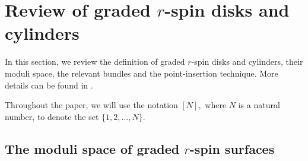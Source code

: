 \documentclass[11pt]{amsart}
\theoremstyle{definition}
\theoremstyle{remark}
\newcommand{\<}{\left<}
\renewcommand{\>}{\right>}
\numberwithin{equation}{section}
\begin{document}
\section{Review of graded $r$-spin disks and cylinders}\label{sec review}
\label{sec mod and bundle}
In %
this section, we review the definition of graded $r$-spin disks and cylinders, their moduli space, the %
relevant bundles and %
the point-insertion technique. %
More details can be found in \cite{BCT1,TZ1}.

Throughout %
the paper, we %
will use the notation $[N],$ where $N$ is a natural number, to denote the set $\{1,2,\dots,N\}.$


\subsection{The moduli space of graded $r$-spin surfaces}
\end{document}
